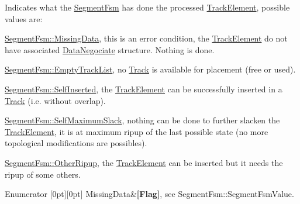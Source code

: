 Indicates what the \mbox{\hyperlink{classKite_1_1SegmentFsm}{Segment\+Fsm}} has done the processed \mbox{\hyperlink{classKite_1_1TrackElement}{Track\+Element}}, possible values are\+:
\begin{DoxyItemize}
\item \mbox{\hyperlink{classKite_1_1SegmentFsm_a5d74787dedbc4e11c1ab15bf487e61f8a79ae4f26b8ed9c55b81f981bb5076e1d}{Segment\+Fsm\+::\+Missing\+Data}}, this is an error condition, the \mbox{\hyperlink{classKite_1_1TrackElement}{Track\+Element}} do not have associated \mbox{\hyperlink{classKite_1_1DataNegociate}{Data\+Negociate}} structure. Nothing is done.
\item \mbox{\hyperlink{classKite_1_1SegmentFsm_a5d74787dedbc4e11c1ab15bf487e61f8a13ac7e0722ca806ff25d8fa9220e980b}{Segment\+Fsm\+::\+Empty\+Track\+List}}, no \mbox{\hyperlink{classKite_1_1Track}{Track}} is available for placement (free or used).
\item \mbox{\hyperlink{classKite_1_1SegmentFsm_a5d74787dedbc4e11c1ab15bf487e61f8a8c564779c81599aaadbe879fa2b08d92}{Segment\+Fsm\+::\+Self\+Inserted}}, the \mbox{\hyperlink{classKite_1_1TrackElement}{Track\+Element}} can be successfully inserted in a \mbox{\hyperlink{classKite_1_1Track}{Track}} (i.\+e. without overlap).
\item \mbox{\hyperlink{classKite_1_1SegmentFsm_a5d74787dedbc4e11c1ab15bf487e61f8a560766bb79539564fdeda432c8efae6d}{Segment\+Fsm\+::\+Self\+Maximum\+Slack}}, nothing can be done to further slacken the \mbox{\hyperlink{classKite_1_1TrackElement}{Track\+Element}}, it is at maximum ripup of the last possible state (no more topological modifications are possibles).
\item \mbox{\hyperlink{classKite_1_1SegmentFsm_a5d74787dedbc4e11c1ab15bf487e61f8a22374bab829fac7d12af4784d80eeb6e}{Segment\+Fsm\+::\+Other\+Ripup}}, the \mbox{\hyperlink{classKite_1_1TrackElement}{Track\+Element}} can be inserted but it needs the ripup of some others. 
\end{DoxyItemize}\begin{DoxyEnumFields}{Enumerator}
[0pt][0pt]{}\mbox{\label{classKite_1_1SegmentFsm_a5d74787dedbc4e11c1ab15bf487e61f8a79ae4f26b8ed9c55b81f981bb5076e1d}} 
Missing\+Data&{\bfseries \mbox{[}Flag\mbox{]}}, see Segment\+Fsm\+::\+Segment\+Fsm\+Value. \\
\hline


\end{DoxyEnumFields}

